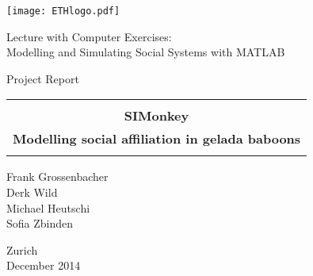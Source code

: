 
\thispagestyle{empty}

\begin{center}
\texttt{[image: ETHlogo.pdf]}

\bigskip


\bigskip


\bigskip


\LARGE{ 	Lecture with Computer Exercises:\\ }
\LARGE{ Modelling and Simulating Social Systems with MATLAB\\}

\bigskip

\bigskip

\small{Project Report}\\

\bigskip

\bigskip

\bigskip

\bigskip


\begin{tabular}{|c|}
\hline
\\
\textbf{\huge{SIMonkey}}\\
\textbf{\LARGE{Modelling social affiliation in gelada baboons}}\\
\\
\hline
\end{tabular}
\bigskip

\bigskip

\bigskip

\LARGE{Frank Grossenbacher\\ Derk Wild\\ Michael Heutschi\\ Sofia Zbinden}



\bigskip

\bigskip

\bigskip

\bigskip

\bigskip

\bigskip

\bigskip

\bigskip

Zurich\\
December 2014\\

\end{center}


